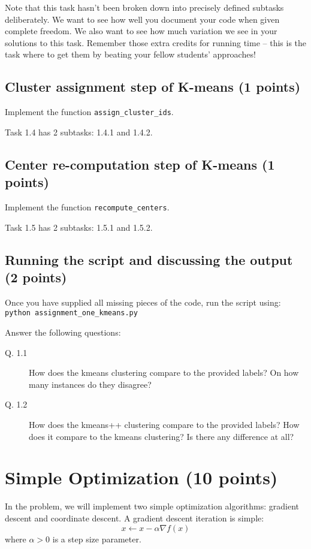\documentclass{article}
\begin{document}
Note that this task hasn't been broken down into precisely defined subtasks deliberately. We want to see how well you document your code when given complete freedom. We also want to see how much
variation we see in your solutions to this task. Remember those extra credits for running time -- this is the task where to get them by beating your fellow students' approaches!

\subsection{Cluster assignment step of K-means (1 points)}

Implement the function {\tt assign\_cluster\_ids}.

Task 1.4 has 2 subtasks: 1.4.1 and 1.4.2.

\subsection{Center re-computation step of K-means (1 points)}

Implement the function {\tt recompute\_centers}.

Task 1.5 has 2 subtasks: 1.5.1 and 1.5.2.

\subsection{Running the script and discussing the output (2 points)}

Once you have supplied all missing pieces of the code, run the script using:\\
{\tt python assignment\_one\_kmeans.py}

Answer the following questions:
\begin{description}
\item[Q. 1.1]
How does the kmeans clustering compare to the provided labels? On how many instances do they disagree?
\item[Q. 1.2]
How does the kmeans++ clustering compare to the provided labels? How does it compare to the kmeans clustering? Is there any difference at all?
\end{description}


\section{Simple Optimization (10 points)}

In the problem, we will implement two simple optimization algorithms: gradient descent and coordinate descent. A gradient descent iteration is simple:
\[
x \gets x - \alpha \nabla f(x)
\]
where $\alpha > 0$ is a step size parameter.
\end{document}
